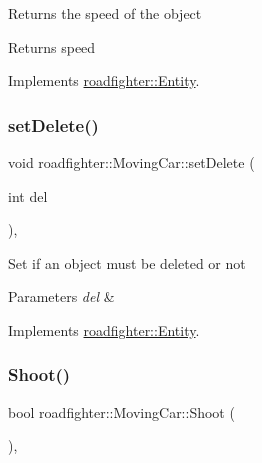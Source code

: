 Returns the speed of the object \begin{DoxyReturn}{Returns}
speed 
\end{DoxyReturn}


Implements \hyperlink{classroadfighter_1_1Entity_ad3760184d764a61922e1db7d98501ee4}{roadfighter\+::\+Entity}.

\mbox{\label{classroadfighter_1_1MovingCar_a2fd9123a7ee59d4796672ad79656e1b5}} 
\subsubsection{\texorpdfstring{set\+Delete()}{setDelete()}}
{\footnotesize\ttfamily void roadfighter\+::\+Moving\+Car\+::set\+Delete (\begin{DoxyParamCaption}\item[{int}]{del }\end{DoxyParamCaption})\hspace{0.3cm}{\ttfamily [override]}, {\ttfamily [virtual]}}

Set if an object must be deleted or not 
\begin{DoxyParams}{Parameters}
{\em del} & \\
\hline
\end{DoxyParams}


Implements \hyperlink{classroadfighter_1_1Entity_a07e973f0fa941a69e749629716877692}{roadfighter\+::\+Entity}.

\mbox{\label{classroadfighter_1_1MovingCar_a5b7a6cf114fe26016434b2fcf3434d37}} 
\subsubsection{\texorpdfstring{Shoot()}{Shoot()}}
{\footnotesize\ttfamily bool roadfighter\+::\+Moving\+Car\+::\+Shoot (\begin{DoxyParamCaption}{ }\end{DoxyParamCaption})\hspace{0.3cm}{\ttfamily [override]}, {\ttfamily [virtual]}}

